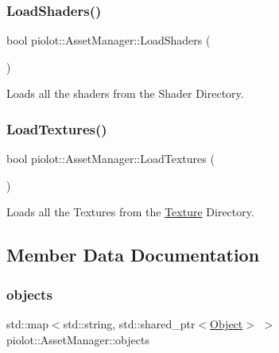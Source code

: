 \subsubsection{\texorpdfstring{Load\+Shaders()}{LoadShaders()}}
{\footnotesize\ttfamily bool piolot\+::\+Asset\+Manager\+::\+Load\+Shaders (\begin{DoxyParamCaption}{ }\end{DoxyParamCaption})\hspace{0.3cm}{\ttfamily [inline]}}



Loads all the shaders from the Shader Directory. 

\mbox{\label{classpiolot_1_1_asset_manager_a34593c7f84f33abd929daa8510507881}} 
\subsubsection{\texorpdfstring{Load\+Textures()}{LoadTextures()}}
{\footnotesize\ttfamily bool piolot\+::\+Asset\+Manager\+::\+Load\+Textures (\begin{DoxyParamCaption}{ }\end{DoxyParamCaption})\hspace{0.3cm}{\ttfamily [inline]}}



Loads all the Textures from the \mbox{\hyperlink{classpiolot_1_1_texture}{Texture}} Directory. 



\subsection{Member Data Documentation}
\mbox{\label{classpiolot_1_1_asset_manager_a5051f83ff594361ac33d94a885afde10}} 
\subsubsection{\texorpdfstring{objects}{objects}}
{\footnotesize\ttfamily std\+::map$<$std\+::string, std\+::shared\+\_\+ptr$<$\mbox{\hyperlink{classpiolot_1_1_object}{Object}}$>$ $>$ piolot\+::\+Asset\+Manager\+::objects}



